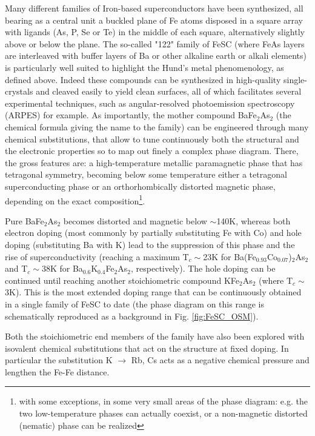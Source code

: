 \documentclass[12pt,twoside]{article}
\begin{document}
Many different families of Iron-based superconductors have been synthesized\cite{PaglioneGreene_NatRev}, all bearing as a central unit a buckled plane of Fe atoms disposed in a square array with ligands (As, P, Se or Te) in the middle of each square, alternatively slightly above or below the plane.
The so-called "122" family of FeSC (where FeAs layers are interleaved with buffer layers of Ba or other alkaline earth or alkali elements) is particularly well suited to highlight the Hund's metal phenomenology, as defined above. Indeed these compounds can be synthesized in high-quality single-crystals and cleaved easily to yield clean surfaces, all of which facilitates several experimental techniques, such as angular-resolved photoemission spectroscopy (ARPES) for example. 
As importantly, the mother compound BaFe$_2$As$_2$ (the chemical formula giving the name to the family) can be engineered through many chemical substitutions, that allow to tune continuously both the structural and the electronic properties so to map out finely a complex phase diagram. There, the gross features are: a high-temperature metallic paramagnetic phase that has tetragonal symmetry, becoming below some temperature either a tetragonal superconducting phase or an orthorhombically distorted magnetic phase, depending on the exact composition\footnote{with some exceptions, in some very small areas of the phase diagram: e.g. the two low-temperature phases can actually coexist, or a non-magnetic distorted (nematic) phase can be realized}.

Pure BaFe$_2$As$_2$ becomes distorted and magnetic below $\sim$140K, whereas both electron doping (most commonly by partially substituting Fe with Co) and hole doping (substituting Ba with K) lead to the suppression of this phase and the rise of superconductivity (reaching a maximum T$_c\sim$23K for Ba(Fe$_{0.93}$Co$_{0.07}$)$_2$As$_2$ and T$_c\sim$38K for  Ba$_{0.6}$K$_{0.4}$Fe$_2$As$_2$, respectively). The hole doping can be continued until reaching another stoichiometric compound KFe$_2$As$_2$ (where T$_c\sim$3K).
This is the most extended doping range that can be continuously obtained in a single family of FeSC to date (the phase diagram on this range is schematically reproduced as a background in Fig. \ref{fig:FeSC_OSM}).

Both the stoichiometric end members of the family have also been explored with isovalent chemical substitutions that act on the structure at fixed doping. In particular the substitution K $\rightarrow$ Rb, Cs acts as a negative chemical pressure and lengthen the Fe-Fe distance.
\end{document}
